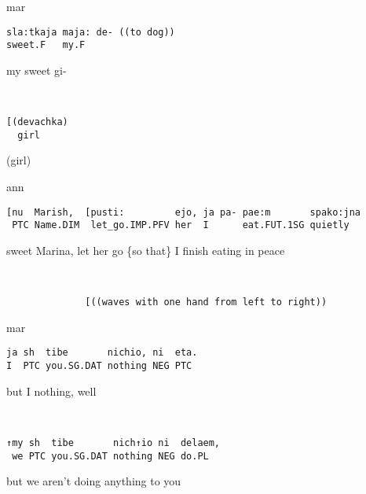 \documentclass[output=paper,modfonts,nonflat]{langsci/langscibook}
\begin{document}
\newpage
{}\vspace{2mm}
%
\begin{transbox}{1}{mar}
\begin{verbatim}
sla:tkaja maja: de- ((to dog))
sweet.F   my.F
\end{verbatim}
my sweet gi-
\end{transbox}
%
\begin{transbox}{2}{~}
\begin{verbatim}
[(devachka)
  girl
\end{verbatim}
\hspace{0.07cm} (girl)
\end{transbox}
%
\begin{mdframednoverticalspace}[style=firstfoc]
\begin{transbox}{3}{ann}
\begin{verbatim}
[nu  Marish,  [pusti:         ejo, ja pa- pae:m       spako:jna
 PTC Name.DIM  let_go.IMP.PFV her  I      eat.FUT.1SG quietly
\end{verbatim}
\hspace{0.07cm} sweet Marina, let her go \{so that\} I finish eating in peace
\end{transbox}
\end{mdframednoverticalspace}
%
\begin{transbox}{4}{~}
\begin{verbatim}
              [((waves with one hand from left to right))
\end{verbatim}
\end{transbox}
%
%
\begin{mdframednoverticalspace}[style=secondfoc]
\begin{transbox}{6}{mar}
\begin{verbatim}
ja sh  tibe       nichio, ni  eta.
I  PTC you.SG.DAT nothing NEG PTC
\end{verbatim}
but I nothing, well
\end{transbox}
\end{mdframednoverticalspace}
%
\begin{mdframednoverticalspace}[style=secondfoc]
\begin{transbox}{7}{~}
\begin{verbatim}
↑my sh  tibe       nich↑io ni  delaem,
 we PTC you.SG.DAT nothing NEG do.PL
\end{verbatim}
\hspace{0.07cm} but we aren’t doing anything to you
\end{transbox}
\end{mdframednoverticalspace}
\end{document}
